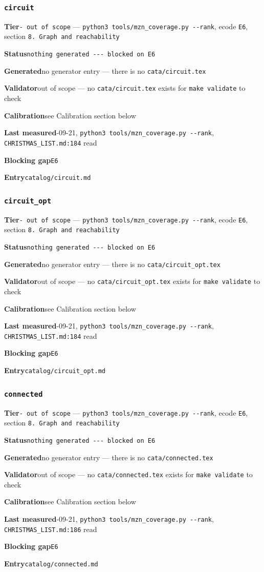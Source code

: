 \documentclass[10pt,a4paper]{article}
\newcommand{\entryfield}[2]{{\raggedright\textbf{#1}\quad #2\par}}
\begin{document}
\subsubsection*{\texttt{circuit}}
\label{entry:circuit}
\entryfield{Tier}{\texttt{- out of scope} --- \texttt{python3 tools/\allowbreak{}mzn\_\allowbreak{}coverage.\allowbreak{}py -\allowbreak{}-\allowbreak{}rank}, ecode \texttt{E6}, section \texttt{8.\allowbreak{} Graph and reachability}}
\entryfield{Status}{\texttt{nothing generated -\allowbreak{}-\allowbreak{}-\allowbreak{} blocked on E6}}
\entryfield{Generated}{no generator entry --- there is no \texttt{cata/circuit.tex}}
\entryfield{Validator}{out of scope --- no \texttt{cata/circuit.tex} exists for \texttt{make validate} to check}
\entryfield{Calibration}{see Calibration section below}
\entryfield{Last measured}{2026-09-21, \texttt{python3 tools/\allowbreak{}mzn\_\allowbreak{}coverage.\allowbreak{}py -\allowbreak{}-\allowbreak{}rank}, \texttt{CHRISTMAS\_LIST.md:184} read}
\entryfield{Blocking gap}{\texttt{E6}}
\entryfield{Entry}{\texttt{catalog/circuit.md}}
\subsubsection*{\texttt{circuit\_\allowbreak{}opt}}
\label{entry:circuit-opt}
\entryfield{Tier}{\texttt{- out of scope} --- \texttt{python3 tools/\allowbreak{}mzn\_\allowbreak{}coverage.\allowbreak{}py -\allowbreak{}-\allowbreak{}rank}, ecode \texttt{E6}, section \texttt{8.\allowbreak{} Graph and reachability}}
\entryfield{Status}{\texttt{nothing generated -\allowbreak{}-\allowbreak{}-\allowbreak{} blocked on E6}}
\entryfield{Generated}{no generator entry --- there is no \texttt{cata/circuit\_opt.tex}}
\entryfield{Validator}{out of scope --- no \texttt{cata/circuit\_opt.tex} exists for \texttt{make validate} to check}
\entryfield{Calibration}{see Calibration section below}
\entryfield{Last measured}{2026-09-21, \texttt{python3 tools/\allowbreak{}mzn\_\allowbreak{}coverage.\allowbreak{}py -\allowbreak{}-\allowbreak{}rank}, \texttt{CHRISTMAS\_LIST.md:184} read}
\entryfield{Blocking gap}{\texttt{E6}}
\entryfield{Entry}{\texttt{catalog/circuit\_opt.md}}
\subsubsection*{\texttt{connected}}
\label{entry:connected}
\entryfield{Tier}{\texttt{- out of scope} --- \texttt{python3 tools/\allowbreak{}mzn\_\allowbreak{}coverage.\allowbreak{}py -\allowbreak{}-\allowbreak{}rank}, ecode \texttt{E6}, section \texttt{8.\allowbreak{} Graph and reachability}}
\entryfield{Status}{\texttt{nothing generated -\allowbreak{}-\allowbreak{}-\allowbreak{} blocked on E6}}
\entryfield{Generated}{no generator entry --- there is no \texttt{cata/connected.tex}}
\entryfield{Validator}{out of scope --- no \texttt{cata/connected.tex} exists for \texttt{make validate} to check}
\entryfield{Calibration}{see Calibration section below}
\entryfield{Last measured}{2026-09-21, \texttt{python3 tools/\allowbreak{}mzn\_\allowbreak{}coverage.\allowbreak{}py -\allowbreak{}-\allowbreak{}rank}, \texttt{CHRISTMAS\_LIST.md:186} read}
\entryfield{Blocking gap}{\texttt{E6}}
\entryfield{Entry}{\texttt{catalog/connected.md}}
\end{document}

